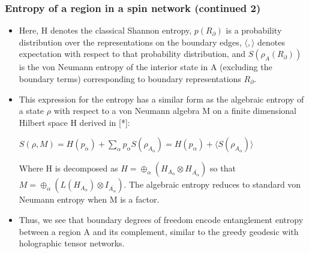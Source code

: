 \documentclass[11pt]{beamer}
\begin{document}
\begin{frame}
	
	\frametitle{Entropy of a region in a spin network (continued 2)}
	
	\begin{itemize}
		
		
		\item 	Here, H denotes the classical Shannon entropy, $p(R_{\partial})$ is a probability distribution over the representations on the boundary edges, $ \langle , \rangle $ denotes expectation with respect to that probability distribution, and $S(\rho_A (R_{\partial}))$ is the von Neumann entropy of the interior state in A (excluding the boundary terms) corresponding to boundary representations $R_\partial$. 
		
	\item	This expression for the entropy has a similar form as the algebraic entropy of a state $\rho$ with respect to a von Neumann algebra M on a finite dimensional Hilbert space H derived in [*]: 
		
		$S(\rho, M) = H(p_\alpha) + \sum_\alpha p_\alpha S(\rho_{A_\alpha}) = H(p_\alpha) + \langle S(\rho_{A_\alpha}) \rangle$ 
		
		Where H is decomposed as $H = \oplus_\alpha (H_{A_\alpha} \otimes H_{\bar{A_\alpha}})$ so that $M = \oplus_\alpha (L(H_{A_\alpha}) \otimes I_{\bar{A_\alpha}})$. The algebraic entropy reduces to standard von Neumann entropy when M is a factor. 
		
		\item Thus, we see that boundary degrees of freedom encode entanglement entropy between a region A and its complement, similar to the greedy geodesic with holographic tensor networks. 
		
	\end{itemize}
	
\end{frame}
\end{document}
